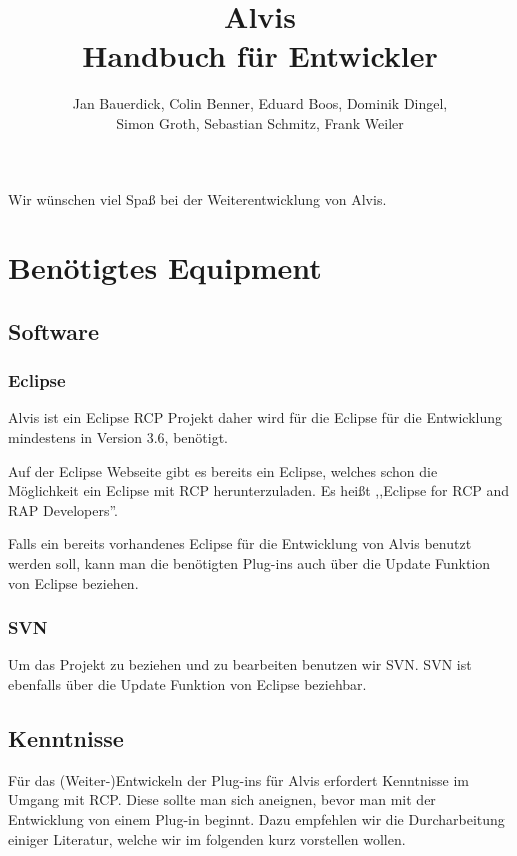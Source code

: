 \documentclass[10pt,a4paper,oneside]{scrbook}
\author{Jan Bauerdick,
Colin Benner,
Eduard Boos,
Dominik Dingel,\\
Simon Groth,
Sebastian Schmitz,
Frank Weiler}
\title{Alvis\\Handbuch für Entwickler}
\begin{document}
\maketitle
\newpage
\tableofcontents
\newpage
Wir wünschen viel Spaß bei der Weiterentwicklung von Alvis.
\chapter{Benötigtes Equipment}
\section{Software}
\subsection{Eclipse}
Alvis ist ein Eclipse RCP Projekt daher wird für die Eclipse für die Entwicklung mindestens in Version 3.6, benötigt.

Auf der Eclipse Webseite gibt es bereits ein Eclipse, welches schon die Möglichkeit ein Eclipse mit RCP herunterzuladen. Es heißt ,,Eclipse for RCP and RAP Developers''. 

Falls ein bereits vorhandenes Eclipse für die Entwicklung von Alvis benutzt werden soll, kann man die benötigten Plug-ins auch über die Update Funktion von Eclipse beziehen.
\subsection{SVN}
Um das Projekt zu beziehen und zu bearbeiten benutzen wir SVN. SVN ist ebenfalls über die Update Funktion von Eclipse beziehbar.

\section{Kenntnisse}
Für das (Weiter-)Entwickeln der Plug-ins für Alvis erfordert Kenntnisse im Umgang mit RCP. Diese sollte man sich aneignen, bevor man mit der Entwicklung von einem Plug-in beginnt. Dazu empfehlen wir die Durcharbeitung einiger Literatur, welche wir im folgenden kurz vorstellen wollen.
\end{document}
